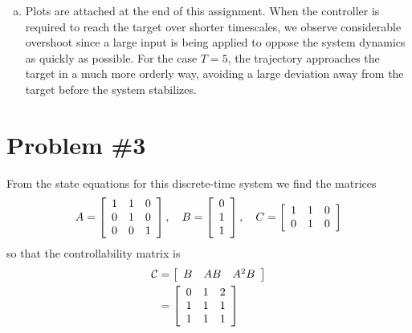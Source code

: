 \documentclass{article}
\begin{document}
\begin{enumerate}[(a)]
{%
%
  }
  \item{
    Plots are attached at the end of this assignment. When the
    controller is required to reach the 
    target over shorter timescales, we observe considerable overshoot
    since a large input is being applied to oppose the system dynamics
    as quickly as possible. For the case $T = 5$, the trajectory
    approaches the target in a much more orderly way, avoiding a large
    deviation away from the target before the system stabilizes.
  }
\end{enumerate}

\pagebreak

\section*{Problem \#3}
From the state equations for this discrete-time system
we find the matrices
$$
A = 
\left[\begin{array}{c c c}
  1 & 1 & 0 \\
  0 & 1 & 0 \\
  0 & 0 & 1
\end{array}\right], \quad
B =
\left[\begin{array}{c}
  0 \\ 1 \\ 1
\end{array}\right], \quad
C =
\left[\begin{array}{c c c}
  1 & 1 & 0 \\
  0 & 1 & 0
\end{array}\right]
$$
so that the controllability matrix is
\begin{align*}
\mathcal{C} &=
\left[\begin{array}{c c c}
  B & A B & A^2 B
\end{array}\right] \\
&=
\left[\begin{array}{c c c}
  0 & 1 & 2 \\
  1 & 1 & 1 \\
  1 & 1 & 1
\end{array}\right]
\end{align*}
\end{document}
